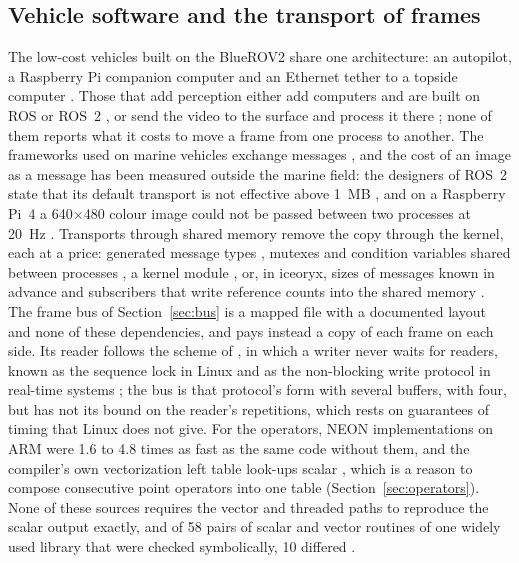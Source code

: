 \subsection{Vehicle software and the transport of frames}\label{sec:rw-software}

The low-cost vehicles built on the BlueROV2 share one architecture: an
autopilot, a Raspberry Pi companion computer and an Ethernet tether to a topside
computer \cite{vonbenzon2022,willners2021,edge2020,wilby2020,manzanilla2019}.
Those that add perception either add computers and are built on ROS or ROS~2
\cite{willners2021,edge2020,wilby2020,fernandez2026}, or send the video to the
surface and process it there
\cite{manzanilla2019,akram2022,akram2025,alinei2024}; none of them reports what
it costs to move a frame from one process to another. The frameworks used on
marine vehicles exchange messages
\cite{quigley2009,huang2010lcm,macenski2022,benjamin2010,martins2009,pinto2013},
and the cost of an image as a message has been measured outside the marine
field: the designers of ROS~2 state that its default transport is not effective
above 1~MB \cite{macenski2022}, and on a Raspberry Pi~4 a 640$\times$480 colour
image could not be passed between two processes at 20~Hz \cite{macenski2023}.
Transports through shared memory remove the copy through the kernel, each at a
price: generated message types \cite{wang2019tzc}, mutexes and condition
variables shared between processes \cite{iordache2021}, a kernel module
\cite{ishikawa2025}, or, in iceoryx, sizes of messages known in advance and
subscribers that write reference counts into the shared memory
\cite{pohnl2023}. The frame bus of Section~\ref{sec:bus} is a mapped file with a
documented layout and none of these dependencies, and pays instead a copy of
each frame on each side. Its reader follows the scheme of \cite{lamport1977}, in
which a writer never waits for readers, known as the sequence lock in Linux
\cite{boehm2012} and as the non-blocking write protocol in real-time systems
\cite{kopetz1993}; the bus is that protocol's form with several buffers, with
four, but has not its bound on the reader's repetitions, which rests on
guarantees of timing that Linux does not give. For the operators, NEON
implementations on ARM were 1.6 to 4.8 times as fast as the same code without
them, and the compiler's own vectorization left table look-ups scalar
\cite{pulli2012,khadem2023}, which is a reason to compose consecutive point
operators into one table (Section~\ref{sec:operators}). None of these sources
requires the vector and threaded paths to reproduce the scalar output exactly,
and of 58 pairs of scalar and vector routines of one widely used library that
were checked symbolically, 10 differed \cite{collingbourne2011}.
